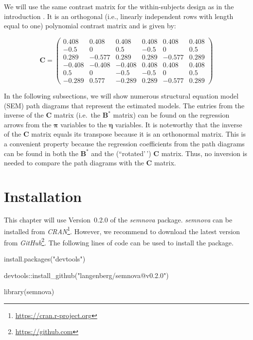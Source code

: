 \documentclass[
]{book}
\newenvironment{Shaded}{\begin{snugshade}}{\end{snugshade}}
\newcommand{\FunctionTok}[1]{\textcolor[rgb]{0.00,0.00,0.00}{#1}}
\newcommand{\NormalTok}[1]{#1}
\newcommand{\SpecialCharTok}[1]{\textcolor[rgb]{0.00,0.00,0.00}{#1}}
\newcommand{\StringTok}[1]{\textcolor[rgb]{0.31,0.60,0.02}{#1}}
\begin{document}
We will use the same contrast matrix for the within-subjects design as in the introduction \citep[see][Section 1.2 ``Latent Repeated Measures ANOVA'']{Langenberg2022z}. It is an orthogonal (i.e., linearly independent rows with length equal to one) polynomial contrast matrix and is given by:

\[
\mathbf{C} = \begin{pmatrix}
    0.408 & 0.408 & 0.408 & 0.408 & 0.408 & 0.408\\
    -0.5 & 0 & 0.5 & -0.5 & 0 & 0.5\\
    0.289 & -0.577 & 0.289 & 0.289 & -0.577 & 0.289\\
    -0.408 & -0.408 & -0.408 & 0.408 & 0.408 & 0.408\\
    0.5 & 0 & -0.5 & -0.5 & 0 & 0.5\\
    -0.289 & 0.577 & -0.289 & 0.289 & -0.577 & 0.289
\end{pmatrix}
\label{eq:introduction-c-matrix}
\]

In the following subsections, we will show numerous structural equation model (SEM) path diagrams that represent the estimated models. The entries from the inverse of the \(\mathbf{C}\) matrix (i.e.~the \(\mathbf{B}^{*}\) matrix) can be found on the regression arrows from the \(\boldsymbol{\pi}\) variables to the \(\boldsymbol{\eta}\) variables. It is noteworthy that the inverse of the \(\mathbf{C}\) matrix equals its transpose because it is an orthonormal matrix. This is a convenient property because the regression coefficients from the path diagrams can be found in both the \(\mathbf{B}^{*}\) and the (``rotated'\,') \(\mathbf{C}\) matrix. Thus, no inversion is needed to compare the path diagrams with the \(\mathbf{C}\) matrix.

\hypertarget{installation}{%
\chapter{Installation}\label{installation}}

This chapter will use Version~0.2.0 of the \emph{semnova} package. \emph{semnova} can be installed from \emph{CRAN}\footnote{\url{https://cran.r-project.org}}. However, we recommend to download the latest version from \emph{GitHub}\footnote{\url{https://github.com}}. The following lines of code can be used to install the package.

\begin{Shaded}
\begin{Highlighting}[]
\FunctionTok{install.packages}\NormalTok{(}\StringTok{"devtools"}\NormalTok{)}

\NormalTok{devtools}\SpecialCharTok{::}\FunctionTok{install\_github}\NormalTok{(}\StringTok{"langenberg/semnova@v0.2.0"}\NormalTok{)}

\FunctionTok{library}\NormalTok{(semnova)}
\end{Highlighting}
\end{Shaded}
\end{document}
